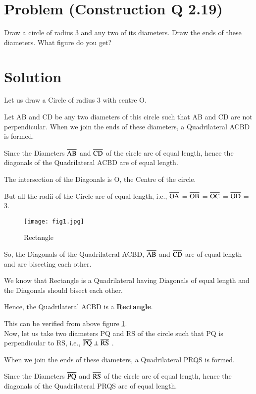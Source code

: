 \documentclass[journal,12pt,twocolumn]{IEEEtran}
\begin{document}
\section*{\textbf{Problem (Construction Q 2.19)}}
Draw a circle of radius 3 and any two of its diameters. Draw the ends of these diameters. What figure do you get?
\section*{\textbf{Solution}}
Let us draw a Circle of radius 3 with centre O.

Let AB and CD be any two diameters of this circle such that AB and CD are not perpendicular. When we join the ends of these diameters, a Quadrilateral ACBD is formed.

Since the Diameters $\overline{\rm AB}$ and $\overline{\rm CD}$ of the circle are of equal length, hence the diagonals of the Quadrilateral ACBD are of equal length.

The intersection of the Diagonals is O, the Centre of the circle.

But all the radii of the Circle are of equal length, i.e., $\overline{\rm OA}$ = $\overline{\rm OB}$ = $\overline{\rm OC}$ = $\overline{\rm OD}$ = 3.

\begin{figure}[!h]
\centering
\texttt{[image: fig1.jpg]}
\caption{Rectangle}
\label{rectangle}
\end{figure}

So, the Diagonals of the Quadrilateral ACBD, $\overline{\rm AB}$ and $\overline{\rm CD}$ are of equal length and are bisecting each other.

We know that Rectangle is a Quadrilateral having Diagonals of equal length and the Diagonals should bisect each other.

Hence, the Quadrilateral ACBD is a \textbf{Rectangle}. 

This can be verified from above figure \ref{rectangle}. \\

Now, let us take two diameters PQ and RS of the circle such that PQ is perpendicular to RS, i.e., $\overline{\rm PQ} \perp \overline{\rm RS}$ .

When we join the ends of these diameters, a Quadrilateral PRQS is formed.

Since the Diameters $\overline{\rm PQ}$ and $\overline{\rm RS}$ of the circle are of equal length, hence the diagonals of the Quadrilateral PRQS are of equal length.
\end{document}
